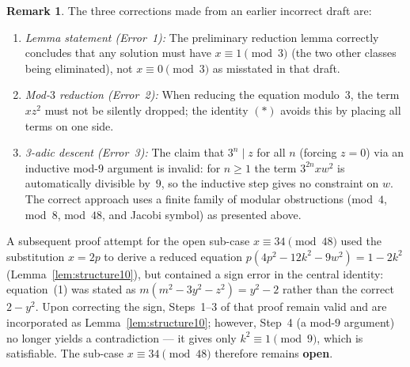 \documentclass[12pt, a4paper]{amsart}
\theoremstyle{plain}
\theoremstyle{definition}
\newtheorem{remark}[theorem]{Remark}
\begin{document}
\begin{remark}
  The three corrections made from an earlier incorrect draft are:
  \begin{enumerate}
    \item \emph{Lemma statement (Error~1):} The preliminary reduction lemma
          correctly concludes that any solution must have $x \equiv 1
          \pmod{3}$ (the two other classes being eliminated), not
          $x \equiv 0 \pmod{3}$ as misstated in that draft.
    \item \emph{Mod-$3$ reduction (Error~2):} When reducing the equation
          modulo~$3$, the term $xz^2$ must not be silently dropped;
          the identity $(*)$ avoids this by placing all terms on one side.
    \item \emph{3-adic descent (Error~3):} The claim that $3^n \mid z$ for
          all $n$ (forcing $z = 0$) via an inductive mod-$9$ argument is
          invalid: for $n \geq 1$ the term $3^{2n}xw^2$ is automatically
          divisible by~$9$, so the inductive step gives no constraint on $w$.
          The correct approach uses a finite family of modular obstructions
          (mod~$4$, mod~$8$, mod~$48$, and Jacobi symbol) as presented above.
  \end{enumerate}
  A subsequent proof attempt for the open sub-case $x \equiv 34 \pmod{48}$
  used the substitution $x = 2p$ to derive a reduced equation
  $p(4p^2-12k^2-9w^2) = 1-2k^2$ (Lemma~\ref{lem:structure10}), but
  contained a sign error in the central identity: equation~(1) was stated
  as $m(m^2-3y^2-z^2) = y^2-2$ rather than the correct $2-y^2$.
  Upon correcting the sign, Steps~1--3 of that proof remain valid and are
  incorporated as Lemma~\ref{lem:structure10}; however, Step~4 (a mod-$9$
  argument) no longer yields a contradiction --- it gives only $k^2 \equiv 1
  \pmod{9}$, which is satisfiable.  The sub-case $x \equiv 34 \pmod{48}$
  therefore remains \textbf{open}.
\end{remark}
\end{document}
